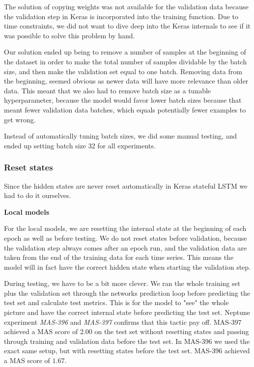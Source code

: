 The solution of copying weights was not available for the validation data
because the validation step in Keras is incorporated into the training function.
Due to time constraints, we did not want to dive deep into the Keras internals
to see if it was possible to solve this problem by hand.

Our solution ended up being to remove a number of samples at the beginning of
the dataset in order to make the total number of samples dividable by the batch size,
and then make the validation set equal to one batch. Removing data from the beginning,
seemed obvious as newer data will have more relevance than older data.
This meant that we also had to remove batch size as a tunable hyperparameter,
because the model would favor lower batch sizes because that meant fewer validation data batches,
which equals potentially fewer examples to get wrong.

Instead of automatically tuning batch sizes, we did some manual testing, and
ended up setting batch size 32 for all experiments.


\subsubsection{Reset states}
\label{section:Method:lstm-reset-hidden-states}
Since  the hidden states are never reset automatically in Keras stateful LSTM
we had to do it ourselves.

\textbf{Local models}

For the local models, we are resetting the internal state at the beginning
of each epoch as well as before testing. We do not reset states before validation,
because the validation step always comes after an epoch run, and the
validation data are taken from the end of the training data for each time series.
This means the model will in fact have the correct hidden state when starting the validation step.

During testing, we have to be a bit more clever. We ran the whole training set plus
the validation set through the networks prediction loop before predicting the test
set and calculate test metrics.
This is for the model to "see" the whole picture and have the correct
internal state before predicting the test set.
Neptune experiment \textit{MAS-396} and \textit{MAS-397} confirms
that this tactic pay off. MAS-397 achieved a MAS score of $2.00$ on the test set
without resetting states and passing through training and validation data before
the test set. In MAS-396 we used the exact same setup, but with resetting states
before the test set. MAS-396 achieved a MAS score of $1.67$.

